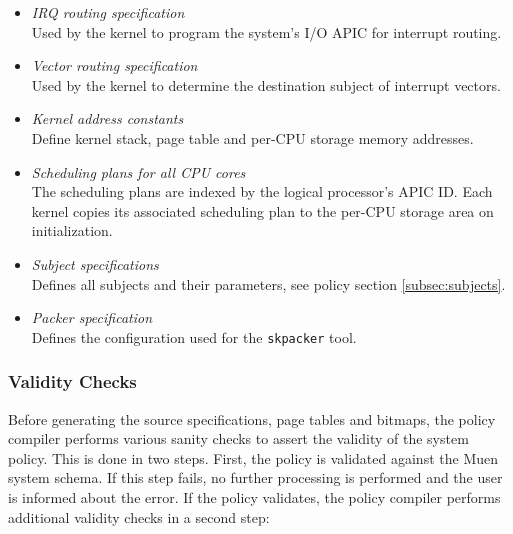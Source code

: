 \begin{itemize}
	\item \emph{IRQ routing specification}\\
		Used by the kernel to program the system's I/O APIC for interrupt
		routing.
	\item \emph{Vector routing specification}\\
		Used by the kernel to determine the destination subject of interrupt
		vectors.
	\item \emph{Kernel address constants}\\
		Define kernel stack, page table and per-CPU storage memory addresses.
	\item \emph{Scheduling plans for all CPU cores}\\
		The scheduling plans are indexed by the logical processor's APIC ID.
		Each kernel copies its associated scheduling plan to the per-CPU storage
		area on initialization.
	\item \emph{Subject specifications}\\
		Defines all subjects and their parameters, see policy section
		\ref{subsec:subjects}.
	\item \emph{Packer specification}\\
		Defines the configuration used for the \texttt{skpacker} tool.
\end{itemize}

\subsubsection{Validity Checks}
Before generating the source specifications, page tables and bitmaps, the policy
compiler performs various sanity checks to assert the validity of the system
policy. This is done in two steps. First, the policy is validated against the
Muen system schema. If this step fails, no further processing is performed and
the user is informed about the error. If the policy validates, the policy
compiler performs additional validity checks in a second step:

